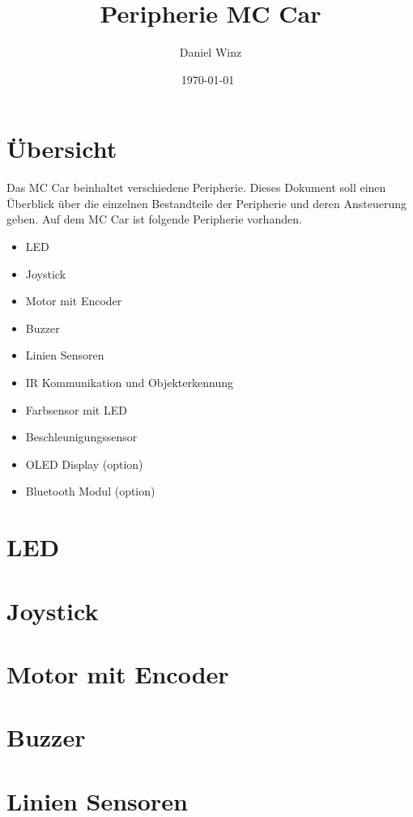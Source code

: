 \documentclass[a4paper,10pt,fleqn]{article}
\title{Peripherie MC Car}
\author{Daniel Winz}
\date{\today~\dtc}
\begin{document}
\maketitle

\newpage

\tableofcontents

\newpage

\section{Übersicht}
Das MC Car beinhaltet verschiedene Peripherie. Dieses Dokument soll einen 
Überblick über die einzelnen Bestandteile der Peripherie und deren Ansteuerung 
geben. Auf dem MC Car ist folgende Peripherie vorhanden. 
\begin{itemize}
  \item LED
  \item Joystick
  \item Motor mit Encoder
  \item Buzzer
  \item Linien Sensoren
  \item IR Kommunikation und Objekterkennung
  \item Farbsensor mit LED
  \item Beschleunigungssensor
  \item OLED Display (option)
  \item Bluetooth Modul (option)
\end{itemize}

\section{LED}

\section{Joystick}

\section{Motor mit Encoder}

\section{Buzzer}

\section{Linien Sensoren}
\end{document}
